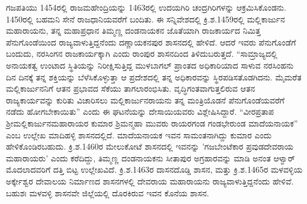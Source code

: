 ಗಜಪತಿಯು 1454ರಲ್ಲಿ ರಾಜಮಹೇಂದ್ರಿಯನ್ನು 1463ರಲ್ಲಿ ಉದಯಗಿರಿ ಚಂದ್ರಗಿರಿಗಳನ್ನು ಆಕ್ರಮಿಸಿಕೊಂಡನು. 1450ರಲ್ಲಿ ಬಹಮನಿ ಸೇನೆ ರಾಜಧಾನಿಯವರೆಗೆ ಬಂದಿತು. ಈ ಸನ್ನಿವೇಶದಲ್ಲಿ ಕ್ರಿ.ಶ.1459ರಲ್ಲಿ ಮಲ್ಲಿಕಾರ್ಜುನ ಮಹಾರಾಯನು, ತನ್ನ ಮಹಾಪ್ರಧಾನ ತಿಮ್ಮಣ್ಣ ದಂಡನಾಯಕನ ಜೊತೆಯಾಗಿ ರಾಜಕಾರ್ಯದ ನಿಮಿತ್ತ ಪೆನುಗೊಂಡೆಯಿಂದ ರಾಜ್ಯವಾಳುತ್ತಿದ್ದನೆಂದು ದಣ್ಣಾಯಕನಪುರ ಶಾಸನದಲ್ಲಿ ಹೇಳಿದೆ. ಆದರೆ ಇವರು ಪೆನುಗೊಂಡೆಗೆ ಬಂದುದು, ನರಸಿಂಗನ ರಾಜಕಾರ್ಯಕ್ಕಾಗಿ ಎಂದು ರಾಂಪುರ ಶಾಸನದಿಂದ ತಿಳಿದುಬರುತ್ತದೆ. “ಸಾಮ್ರಾಜ್ಯದಲ್ಲಿ ಅನಾಯಕತ್ವ ಉಂಟಾದ ಸ್ಥಿತಿಯನ್ನು ನಿರೀಕ್ಷಿಸುತ್ತಿದ್ದ ಮುಳಬಾಗಲ್​ ಪ್ರಾಂತದ ಅಧಿಕಾರಿಯಾದ ಸಾಳುವ ನರಸಿಂಹನು ದಿನ ದಿನಕ್ಕೆ ತನ್ನ ಶಕ್ತಿಯನ್ನು ಬೆಳೆಸಿಕೊಳ್ಳುತ್ತಾ ಆ ಪ್ರದೇಶದಲ್ಲಿ ತನ್ನ ಅಧಿಕಾರವನ್ನು ಸ್ಥಿರಪಡಿಸತೊಡಗಿದನು. ಮೈಮರೆತ ಮಲ್ಲಿಕಾರ್ಜುನನಿಗೆ ಆತನ ಪ್ರಭಾವದ ಸೆಕೆಯು ತಾಗಲಾರಂಭಿಸಿತು. ವೃದ್ಧಿಗಂತವಾಗುತ್ತಲಿರುವ ಆತನ ರಾಜ್ಯಕಾರ್ಯವನ್ನು ಕುರಿತು ವಿಚಾರಿಸಲು ಮಲ್ಲಿಕಾರ್ಜುನರಾಯನು ತನ್ನ ಮಂತ್ರಿಯೊಡನೆ ಪೆನುಗೊಂಡೆಯವರೆಗೆ ನಡೆದು ಹೋಗಬೇಕಾಯಿತು” ಎಂದು ಈ ಘಟನೆಯನ್ನು ದೇಸಾಯಿಯವರು ವಿಶ್ಲೇಷಿಸಿದ್ದಾರೆ. “ವೀರಪ್ರತಾಪ ಶ‍್ರೀಮಲ್ಲಿಕಾರ್ಜುನಮಹಾರಾಯರ ಕುಮಾರ ಶ್ರಿಮನ್ಮಹಾ ಮುವರು ರಾಯರಗಂಡ ಗಂಡಭೇರುಂಡ ಮಾದೆಯನಾಯಕ” ಎಂಬ ಉಲ್ಲೇಖ ಮಾದಿಹಳ್ಳಿ ಶಾಸನದಲ್ಲಿದೆ. ಮಾದೆಯನಾಯಕ ಇವನ ಸಾಮಂತ\-ನಾಗಿದ್ದು ಕುಮಾರ ಎಂದು ಹೇಳಿಕೊಂಡಿರಬಹುದು. ಕ್ರಿ.ಶ.1460ರ ಮೇಲುಕೋಟೆ ಶಾಸನದಲ್ಲಿ ಇವನನ್ನು 'ಗಜಬೇಂಟೆಕಾರ ಪ್ರವುಡದೇವರಾಯ ಮಹಾರಾಯರು' ಎಂದು ಕರೆದಿದ್ದು, ತಿಮ್ಮಣ್ಣ ದಂಡನಾಯಕನು ಸೀತಾಪುರ ಅಗ್ರಹಾರವನ್ನು ಮಾಡಿ ಅನಂತ ಆಳ್ವಾರ್​ ಮೊದಲಾದವರಿಗೆ ದತ್ತಿ ಬಿಟ್ಟ ಉಲ್ಲೇಖವಿದೆ. ಕ್ರಿ.ಶ.1463ರ ದಾಸನದೊಡ್ಡಿ ಶಾಸನ, ಮತ್ತು ಕ್ರಿ.ಶ.1465ರ ಮಳವಳ್ಳಿಯ ಅರ್ಕ್ಕೇಶ್ವರ ದೇವಾಲಯ ನಿರ್ಮಾಣದ ಶಾಸನಗಳಲ್ಲಿ ದೇವರಾಯ ಮಹಾರಾಯನು ರಾಜ್ಯವಾಳುತ್ತಿದ್ದನೆಂದು ಹೇಳಿವೆ. ಬಹುಶಃ ಮಳವಳ್ಳಿ ಶಾಸನವೇ ಜಿಲ್ಲೆಯಲ್ಲಿ ದೊರಕಿರುವ ಇವನ ಕೊನೆಯ ಶಾಸನ.

